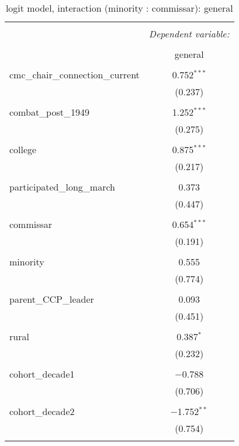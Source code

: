 \documentclass[12pt,letterpaper]{article}
\begin{document}
\begin{table}[!htbp] \centering 
	\caption{logit model, interaction (minority : commissar): general} 
	\label{}
	\rmfamily
	\scriptsize  
	\begin{tabular}{@{\extracolsep{5pt}}lc} 
		\\[-1.8ex]\hline 
		\hline \\[-1.8ex] 
		& \multicolumn{1}{c}{\textit{Dependent variable:}} \\ 
		\cline{2-2} 
		\\[-1.8ex] & general \\ 
		\hline \\[-1.8ex] 
		cmc\_chair\_connection\_current & 0.752$^{***}$ \\ 
		& (0.237) \\ 
		& \\ 
		combat\_post\_1949 & 1.252$^{***}$ \\ 
		& (0.275) \\ 
		& \\ 
		college & 0.875$^{***}$ \\ 
		& (0.217) \\ 
		& \\ 
		participated\_long\_march & 0.373 \\ 
		& (0.447) \\ 
		& \\ 
		commissar & 0.654$^{***}$ \\ 
		& (0.191) \\ 
		& \\ 
		minority & 0.555 \\ 
		& (0.774) \\ 
		& \\ 
		parent\_CCP\_leader & 0.093 \\ 
		& (0.451) \\ 
		& \\ 
		rural & 0.387$^{*}$ \\ 
		& (0.232) \\ 
		& \\ 
		cohort\_decade1 & $-$0.788 \\ 
		& (0.706) \\ 
		& \\ 
		cohort\_decade2 & $-$1.752$^{**}$ \\ 
		& (0.754) \\ 
		& \\ 

\end{tabular}
\end{table}
\end{document}
